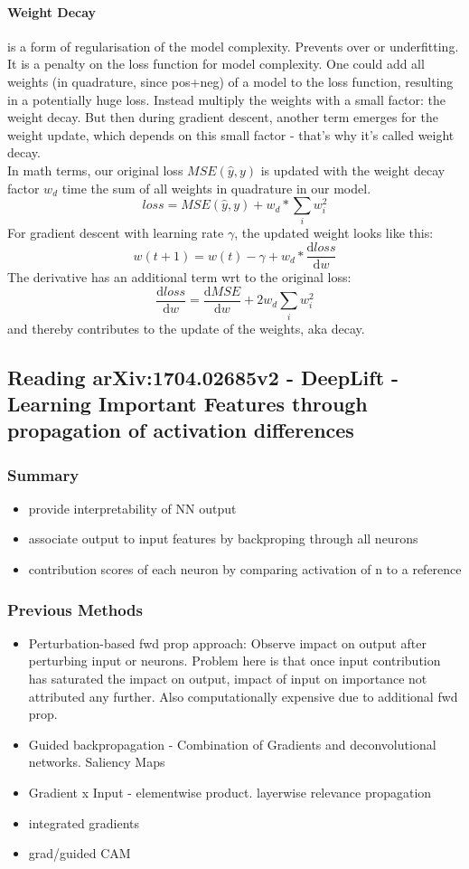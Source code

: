 \paragraph{Weight Decay} is a form of regularisation of the model complexity.
Prevents over or underfitting. It is a penalty on the loss function for model
complexity. One could add all weights (in quadrature, since pos+neg) of a model to the loss function, resulting
in a potentially huge loss. Instead multiply the weights with a small factor:
the weight decay. But then during gradient descent, another term emerges for the
weight update, which depends on this small factor - that's why it's called
weight decay.\\
In math terms, our original loss $MSE(\hat{y},y)$ is updated with the weight
decay factor $w_d$ time the sum of all weights in quadrature in our model.
$$
loss=MSE(\hat{y},y)+w_d*\sum_i{w_i^2}
$$
For gradient descent with learning rate $\gamma$, the updated weight looks like this:
$$
w(t+1)=w(t)-\gamma+w_d*\frac{\mathrm{d}loss}{\mathrm{d}w}
$$
The derivative has an additional term wrt to the original loss:
$$
\frac{\mathrm{d}loss}{\mathrm{d}w}= \frac{\mathrm{d}MSE}{\mathrm{d}w}+2w_d\sum_i{w_i^2}
$$
and thereby contributes to the update of the weights, aka decay.

\subsection{Reading arXiv:1704.02685v2 - DeepLift - Learning Important Features through propagation of activation differences}
\subsubsection{Summary}
\begin{itemize}
  \item provide interpretability of NN output
  \item associate output to input features by backproping through all neurons 
  \item contribution scores of each neuron by comparing activation of n to a reference 
\end{itemize}
\subsubsection{Previous Methods}
\begin{itemize}
  \item Perturbation-based fwd prop approach: Observe impact on output after perturbing input or neurons.
 Problem here is that once input contribution has saturated the impact on output, impact of input on importance not attributed any further.
  Also computationally expensive due to additional fwd prop. 
 \item Guided backpropagation - Combination of Gradients and deconvolutional networks. Saliency Maps
 \item Gradient x Input - elementwise product. layerwise relevance propagation
 \item integrated gradients
 \item grad/guided CAM
\end{itemize}

